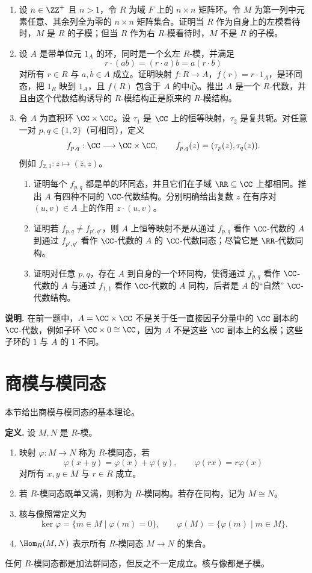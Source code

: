 \begin{enumerate}[label=\arabic*.]
	\item 设 $n\in\ZZ^+$ 且 $n>1$，令 $R$ 为域 $F$ 上的 $n\times n$ 矩阵环。令 $M$ 为第一列中元素任意、其余列全为零的 $n\times n$ 矩阵集合。证明当 $R$ 作为自身上的左模看待时，$M$ 是 $R$ 的子模；但当 $R$ 作为右 $R$-模看待时，$M$ 不是 $R$ 的子模。
	\item 设 $A$ 是带单位元 $1_A$ 的环，同时是一个幺左 $R$-模，并满足
	\[
	r\cdot(ab)=(r\cdot a)b=a(r\cdot b)
	\]
	对所有 $r\in R$ 与 $a,b\in A$ 成立。证明映射 $f:R\to A$，$f(r)=r\cdot1_A$，是环同态，把 $1_R$ 映到 $1_A$，且 $f(R)$ 包含于 $A$ 的中心。推出 $A$ 是一个 $R$-代数，并且由这个代数结构诱导的 $R$-模结构正是原来的 $R$-模结构。
	\item 令 $A$ 为直积环 $\CC\times\CC$。设 $\tau_1$ 是 $\CC$ 上的恒等映射，$\tau_2$ 是复共轭。对任意一对 $p,q\in\{1,2\}$（可相同），定义
	\[
	f_{p,q}:\CC\longrightarrow \CC\times\CC,
	\qquad f_{p,q}(z)=(\tau_p(z),\tau_q(z)).
	\]
	例如 $f_{2,1}:z\mapsto(\bar z,z)$。
	\begin{enumerate}[label=(\alph*)]
		\item 证明每个 $f_{p,q}$ 都是单的环同态，并且它们在子域 $\RR\subseteq\CC$ 上都相同。推出 $A$ 有四种不同的 $\CC$-代数结构。分别明确给出复数 $z$ 在有序对 $(u,v)\in A$ 上的作用 $z\cdot(u,v)$。
		\item 证明若 $f_{p,q}\neq f_{p',q'}$，则 $A$ 上恒等映射不是从通过 $f_{p,q}$ 看作 $\CC$-代数的 $A$ 到通过 $f_{p',q'}$ 看作 $\CC$-代数的 $A$ 的 $\CC$-代数同态；尽管它是 $\RR$-代数同构。
		\item 证明对任意 $p,q$，存在 $A$ 到自身的一个环同构，使得通过 $f_{p,q}$ 看作 $\CC$-代数的 $A$ 与通过 $f_{1,1}$ 看作 $\CC$-代数的 $A$ 同构，后者是 $A$ 的“自然” $\CC$-代数结构。
	\end{enumerate}
\end{enumerate}
\noindent\textbf{说明.} 在前一题中，$A=\CC\times\CC$ 不是关于任一直接因子分量中的 $\CC$ 副本的 $\CC$-代数，例如子环 $\CC\times0\cong\CC$，因为 $A$ 不是这些 $\CC$ 副本上的幺模；这些子环的 $1$ 与 $A$ 的 $1$ 不同。


\section{商模与模同态}

本节给出商模与模同态的基本理论。


\noindent\textbf{定义.} 设 $M,N$ 是 $R$-模。
\begin{enumerate}[label=(\arabic*)]
	\item 映射 $\varphi:M\to N$ 称为 $R$-模同态，若
	\[
	\varphi(x+y)=\varphi(x)+\varphi(y),
	\qquad
	\varphi(rx)=r\varphi(x)
	\]
	对所有 $x,y\in M$ 与 $r\in R$ 成立。
	\item 若 $R$-模同态既单又满，则称为 $R$-模同构。若存在同构，记为 $M\cong N$。
	\item 核与像照常定义为
	\[
	\ker\varphi=\{m\in M\mid \varphi(m)=0\},
	\qquad
	\varphi(M)=\{\varphi(m)\mid m\in M\}.
	\]
	\item $\Hom_R(M,N)$ 表示所有 $R$-模同态 $M\to N$ 的集合。
\end{enumerate}
任何 $R$-模同态都是加法群同态，但反之不一定成立。核与像都是子模。

